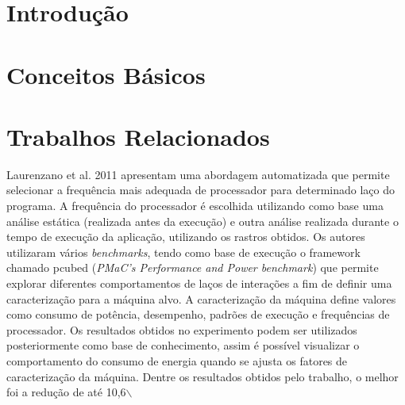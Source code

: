 \documentclass[cic,tc,english]{iiufrgs}
\newcommand{\source}{Source: Author}
\begin{document}

\tableofcontents

\chapter{Introdução}
\label{sec:orgheadline1}

\chapter{Conceitos Básicos}
\label{sec:orgheadline2}
\label{chapter.basic_concepts}


\chapter{Trabalhos Relacionados}
\label{sec:orgheadline3}
\label{chapter.relatedwork}

Laurenzano et al. 2011\cite{laurenzano2011reducing} apresentam uma abordagem automatizada que permite selecionar a frequência mais adequada de processador para determinado laço do programa. A frequência do processador é escolhida utilizando como base uma análise estática (realizada antes da execução) e outra análise realizada durante o tempo de execução da aplicação, utilizando os rastros obtidos. Os autores utilizaram vários \textit{benchmarks}, tendo como base de execução o framework chamado pcubed (\textit{PMaC's Performance and Power benchmark}) que permite explorar diferentes comportamentos de laços de interações a fim de definir uma caracterização para a máquina alvo. A caracterização da máquina define valores como consumo de potência, desempenho, padrões de execução e frequências de processador. Os resultados obtidos no experimento podem ser utilizados posteriormente como base de conhecimento, assim é possível visualizar o comportamento do consumo de energia quando se ajusta os fatores de caracterização da máquina. Dentre os resultados obtidos pelo trabalho, o melhor foi a redução de até 10,6$\backslash$%
\end{document}

